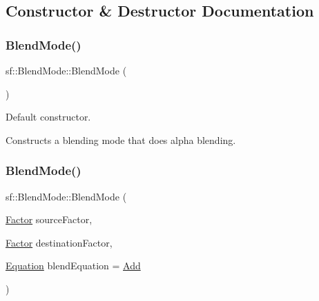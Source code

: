 \subsection{Constructor \& Destructor Documentation}
\mbox{\label{structsf_1_1_blend_mode_a7faef75eae1fb47bbe93f45f38e3d345}} 
\subsubsection{\texorpdfstring{BlendMode()}{BlendMode()}\hspace{0.1cm}{\footnotesize\ttfamily [1/3]}}
{\footnotesize\ttfamily sf\+::\+Blend\+Mode\+::\+Blend\+Mode (\begin{DoxyParamCaption}{ }\end{DoxyParamCaption})}



Default constructor. 

Constructs a blending mode that does alpha blending. \begin{DoxyVerb}\end{DoxyVerb}
 \mbox{\label{structsf_1_1_blend_mode_a23c7452cc8e9eb943c3aea6234ce4297}} 
\subsubsection{\texorpdfstring{BlendMode()}{BlendMode()}\hspace{0.1cm}{\footnotesize\ttfamily [2/3]}}
{\footnotesize\ttfamily sf\+::\+Blend\+Mode\+::\+Blend\+Mode (\begin{DoxyParamCaption}\item[{\mbox{\hyperlink{structsf_1_1_blend_mode_afb9852caf356b53bb0de460c58a9ebbb}{Factor}}}]{source\+Factor,  }\item[{\mbox{\hyperlink{structsf_1_1_blend_mode_afb9852caf356b53bb0de460c58a9ebbb}{Factor}}}]{destination\+Factor,  }\item[{\mbox{\hyperlink{structsf_1_1_blend_mode_a7bce470e2e384c4f9c8d9595faef7c32}{Equation}}}]{blend\+Equation = {\ttfamily \mbox{\hyperlink{structsf_1_1_blend_mode_a7bce470e2e384c4f9c8d9595faef7c32a50c081d8f36cf7b77632966e15d38966}{Add}}} }\end{DoxyParamCaption})}




